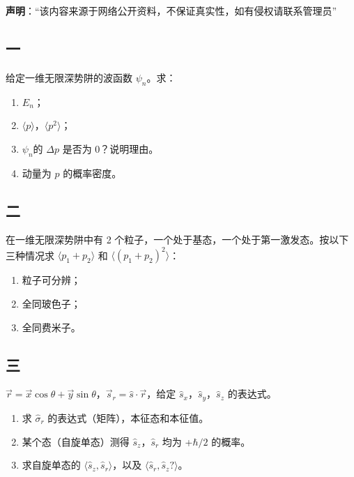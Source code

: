 
\textbf{声明}：“该内容来源于网络公开资料，不保证真实性，如有侵权请联系管理员”

\subsection{一}
给定一维无限深势阱的波函数 $\psi_n$。求：
\begin{enumerate}
    \item $E_n$；
    \item $\langle p \rangle$，$\langle p^2 \rangle$；
    \item $\psi_n$的 $\Delta p$ 是否为 0？说明理由。
    \item 动量为 $p$ 的概率密度。
\end{enumerate}
\subsection{二}
在一维无限深势阱中有 2 个粒子，一个处于基态，一个处于第一激发态。按以下三种情况求 $\langle p_1 + p_2 \rangle$ 和 $\langle (p_1 + p_2)^2 \rangle$：
\begin{enumerate}
    \item 粒子可分辨；
    \item 全同玻色子；
    \item 全同费米子。
\end{enumerate}
\subsection{三}
$\vec{r} = \vec{x} \cos \theta + \vec{y} \sin \theta$，$\vec s_r = \hat{s} \cdot \vec{r}$，给定 $\hat s_x$，$\hat s_y$，$\hat s_z$ 的表达式。
\begin{enumerate}
    \item 求 $ \hat\sigma_r$ 的表达式（矩阵），本征态和本征值。
    \item 某个态（自旋单态）测得 $\hat s_z$，$\hat s_r$ 均为 +$\hbar/2$ 的概率。
    \item 求自旋单态的 $\langle \hat s_z ,\hat s_r \rangle$，以及 $\langle \hat s_r ,\hat s_z ?\rangle$。
\end{enumerate}